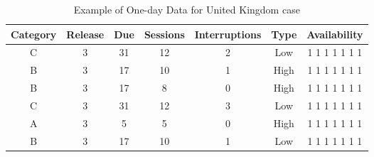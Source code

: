 \begin{table}[h]
\begin{tabular}{|c|c|c|c|c|c|c|}
\hline
Category & Release & Due & Sessions & Interruptions & Type & Availability \\ \hline
C        & 3       & 31  & 12       & 2    & Low        & 1 1 1 1 1 1 1 \\ \hline
B        & 3       & 17  & 10       & 1    & High       & 1 1 1 1 1 1 1 \\ \hline
B        & 3       & 17  & 8        & 0    & High       & 1 1 1 1 1 1 1 \\ \hline
C        & 3       & 31  & 12       & 3    & Low        & 1 1 1 1 1 1 1 \\ \hline
A        & 3       & 5   & 5        & 0    & High       & 1 1 1 1 1 1 1 \\ \hline
B        & 3       & 17  & 10       & 1    & Low        & 1 1 1 1 1 1 1 \\ \hline
\end{tabular}
\caption{Example of One-day Data for United Kingdom case}\label{table-uk}
\end{table}